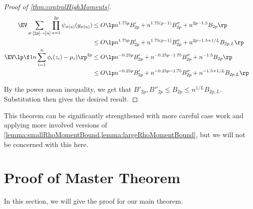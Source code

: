 \documentclass[main.tex]{subfiles}
\begin{document}
\begin{proof}[Proof of \cref{thm:controlHighMoments}]
\begin{align*}
    \EV \sum_{\sigma: [2p] \to [n]} \prod_{a=1}^{2p} \psi_{\sigma(a)}(y_{\sigma(a)})
    &\le
        O\lp
        n^{1.75p} B'_{2p}
        + n^{1.75(p-1)} B''_{2p}
        + n^{2p-1.5} B_{2p}
        \rp
        \\
    &\le
        O\lp
        n^{1.75p} B'_{2p}
        + n^{1.75(p-1)} B''_{2p}
        + n^{2p-1.5+1/L} B_{2p, L}
        \rp
        \\
    \EV \lp \f 1 n \sum_{i=1}^n \phi_i(z_i) - \mu_i)\rp^{2p}
        &\le
           O\lp
            n^{-0.25 p} B'_{2p}
            + n^{-0.25 p - 1.75} B''_{2p}
            + n^{-1.5} B_{2p}
            \rp
            \\
        &\le
           O\lp
            n^{-0.25 p} B'_{2p}
            + n^{-0.25 p - 1.75} B''_{2p}
            + n^{-1.5+1/L} B_{2p, L}
            \rp
\end{align*}

By the power mean inequality, we get that $B'_{2p}, B''_{2p} \le B_{2p} \le n^{1/L} B_{2p,L}$.
Substitution then gives the desired result.

\end{proof}

This theorem can be significantly strengthened with more careful case work and applying more involved versions of \cref{lemma:smallRhoMomentBound,lemma:largeRhoMomentBound}, but we will not be concerned with this here.

\section{Proof of \netsort{} Master Theorem}
\label{sec:proofMainTheorem}
\renewcommand{\nu}{\eta}
\newcommand{\rankext}[1]{{\color{green}#1}}

\newcommand{\coreset}{{\mathcal{M}}}
\newcommand{\basespace}{\mathsf{U}}
\newcommand{\MM}{m}

In this section, we will give the proof for our main theorem.
\end{document}
